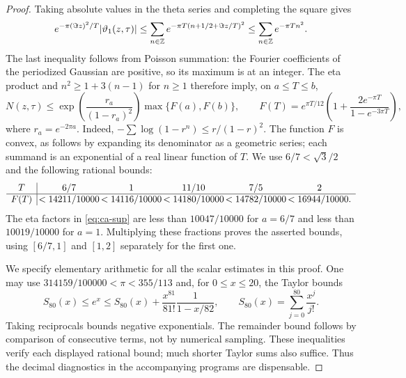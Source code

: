 \begin{proof}
Taking absolute values in the theta series and completing the square
gives
\[
 e^{-\pi(\Im z)^2/T}|\vartheta_1(z,\tau)|
 \le\sum_{n\in\mathbb Z}
 e^{-\pi T(n+1/2+\Im z/T)^2}
 \le\sum_{n\in\mathbb Z}e^{-\pi Tn^2}.
\]
The last inequality follows from Poisson summation: the Fourier
coefficients of the periodized Gaussian are positive, so its maximum
is at an integer. The eta product and $n^2\ge1+3(n-1)$ for $n\ge1$
therefore imply, on $a\le T\le b$,
\begin{equation}\label{eq:ca-sup}
 N(z,\tau)\le
 \exp\!\left(\frac{r_a}{(1-r_a)^2}\right)
 \max\{F(a),F(b)\},\qquad
 F(T)=e^{\pi T/12}
 \left(1+\frac{2e^{-\pi T}}{1-e^{-3\pi T}}\right),
\end{equation}
where $r_a=e^{-2\pi a}$. Indeed,
$-\sum\log(1-r^n)\le r/(1-r)^2$. The function $F$ is convex,
as follows by expanding its denominator as a geometric series;
each summand is an exponential of a real linear function of $T$.
We use $6/7<\sqrt3/2$ and the following rational bounds:
\[
\begin{array}{c|@{\,}c@{\,}c@{\,}c@{\,}c@{\,}c}
T&6/7&1&11/10&7/5&2\\ \hline
F(T)&<14211/10000&<14116/10000&<14180/10000&<14782/10000&<16944/10000.
\end{array}
\]
The eta factors in \eqref{eq:ca-sup} are less than $10047/10000$
for $a=6/7$ and less than $10019/10000$ for $a=1$.
Multiplying these fractions proves the asserted bounds, using
$[6/7,1]$ and $[1,2]$ separately for the first one.

We specify elementary arithmetic for all the scalar estimates in
this proof. One may use $314159/100000<\pi<355/113$ and, for
$0\le x\le20$, the Taylor bounds
\begin{equation}\label{eq:ca-exp}
 S_{80}(x)\le e^x\le
 S_{80}(x)+\frac{x^{81}}{81!}\frac1{1-x/82},
 \qquad S_{80}(x)=\sum_{j=0}^{80}\frac{x^j}{j!}.
\end{equation}
Taking reciprocals bounds negative exponentials. The remainder
bound follows by comparison of consecutive terms, not by numerical
sampling. These inequalities verify each displayed rational bound;
much shorter Taylor sums also suffice. Thus the decimal diagnostics
in the accompanying programs are dispensable.


\end{proof}
